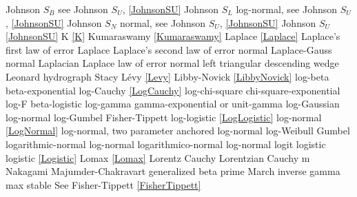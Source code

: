 Johnson $S_B$					\dotfill	see Johnson $S_U$, \eqref{JohnsonSU}	\ncite
Johnson $S_L$					\dotfill	log-normal, see Johnson $S_U$, \eqref{JohnsonSU}		\ncite
Johnson $S_N$					\dotfill	normal, see Johnson $S_U$, \eqref{JohnsonSU}			\ncite
Johnson $S_U$					\dotfill	\eqref{JohnsonSU}					\ncite
%
K								\dotfill	\eqref{K}							\ncite	%
Kumaraswamy						\dotfill	\eqref{Kumaraswamy} 				\ncite	%
%
Laplace							\dotfill	\eqref{Laplace} 						\ncite	%
Laplace's first law of error	\dotfill	Laplace 							\ncite	%
Laplace's second law of error  	\dotfill	normal 							\ncite	%
Laplace-Gauss					\dotfill	normal 							\ncite	%
Laplacian  						\dotfill	Laplace							\ncite 	%
law of error					\dotfill	normal 							\ncite	%
left triangular					\dotfill	descending wedge					\ncite	%
Leonard hydrograph				\dotfill	Stacy 							\ncite	%
L\'{e}vy 						\dotfill	\eqref{Levy}						\ncite	%
Libby-Novick					\dotfill	\eqref{LibbyNovick}					\ncite	
log-beta						\dotfill	beta-exponential					 	%
log-Cauchy					\dotfill	\eqref{LogCauchy}					\ncite
log-chi-square					\dotfill	chi-square-exponential				\ncite	%
log-F							\dotfill	beta-logistic						\ncite	%
log-gamma 					\dotfill	gamma-exponential or unit-gamma		\ncite	%
log-Gaussian					\dotfill	log-normal						\ncite	%
log-Gumbel					\dotfill	Fisher-Tippett						\ncite	%
log-logistic					\dotfill	\eqref{LogLogistic}  					\ncite	%
log-normal					\dotfill	\eqref{LogNormal}					\ncite	%
log-normal, two parameter			\dotfill	anchored log-normal					\ncite	%
log-Weibull 					\dotfill	Gumbel 							\ncite	%
logarithmic-normal				\dotfill	log-normal 						\ncite	%
logarithmico-normal				\dotfill	log-normal 						\ncite	%
logit							\dotfill	logistic 							\ncite	%
logistic 						\dotfill	\eqref{Logistic} 						\ncite	%
Lomax 						\dotfill	\eqref{Lomax}						\ncite	%
Lorentz  						\dotfill	Cauchy 							\ncite	%
Lorentzian  					\dotfill	Cauchy 							\ncite	%
%
m 							\dotfill	Nakagami 						 	%
Majumder-Chakravart			\dotfill	generalized beta prime				 %
March 						\dotfill	inverse gamma						\ncite	%
max stable					\dotfill	See Fisher-Tippett \eqref{FisherTippett}	\ncite
